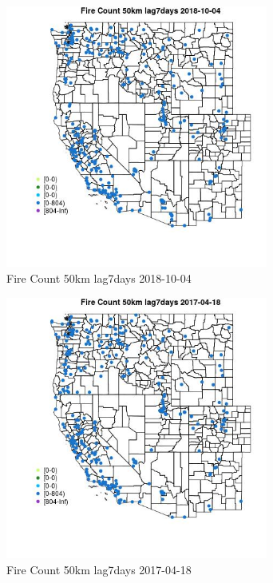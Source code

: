 \begin{figure} 
\centering  
\includegraphics[width=0.77\textwidth]{Code_Outputs/Report_ML_input_PM25_Step4_part_f_de_duplicated_aves_prioritize_24hr_obswNAs_MapObsFire_Count_50km_lag7days2018-10-04.jpg} 
\caption{\label{fig:Report_ML_input_PM25_Step4_part_f_de_duplicated_aves_prioritize_24hr_obswNAsMapObsFire_Count_50km_lag7days2018-10-04}Fire Count 50km lag7days 2018-10-04} 
\end{figure} 
 

\begin{figure} 
\centering  
\includegraphics[width=0.77\textwidth]{Code_Outputs/Report_ML_input_PM25_Step4_part_f_de_duplicated_aves_prioritize_24hr_obswNAs_MapObsFire_Count_50km_lag7days2017-04-18.jpg} 
\caption{\label{fig:Report_ML_input_PM25_Step4_part_f_de_duplicated_aves_prioritize_24hr_obswNAsMapObsFire_Count_50km_lag7days2017-04-18}Fire Count 50km lag7days 2017-04-18} 
\end{figure} 
 

